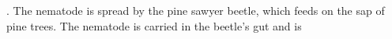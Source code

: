 . The nematode is spread by the pine sawyer beetle, which feeds on the sap of pine trees. The nematode is carried in the beetle's gut and is